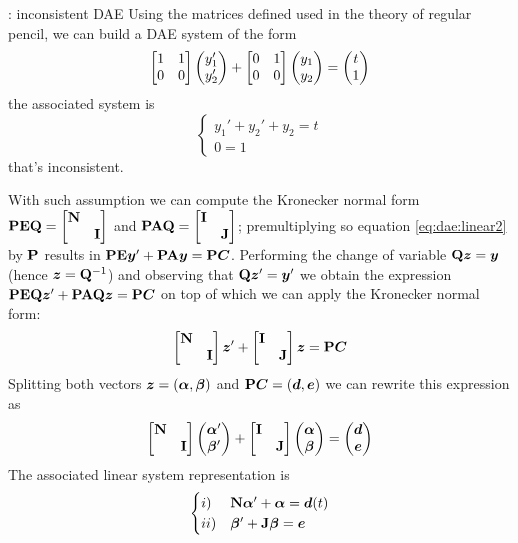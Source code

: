 		\begin{example}{: inconsistent DAE}
			Using the matrices defined used in the theory of regular pencil, we can build a DAE system of the form
			\[ \begin{bmatrix} 1 & 1 \\ 0 & 0 \end{bmatrix} \begin{pmatrix} y_1' \\ y_2' \end{pmatrix} + \begin{bmatrix} 0 & 1 \\ 0 & 0  \end{bmatrix} \begin{pmatrix} y_1 \\ y_2 \end{pmatrix} = \begin{pmatrix} t \\ 1 \end{pmatrix} \]
			the associated system is
			\[ \begin{cases}
				y_1' + y_2' + y_2 = t \\ 0 = 1
			\end{cases} \]
			that's inconsistent.
		\end{example}
		 With such assumption we can compute the Kronecker normal form $\mathbf{PEQ} = \begin{bmatrix} \mathbf{N} \\ & \mathbf{I} \end{bmatrix}$ and $\mathbf{PAQ} = \begin{bmatrix} \mathbf{I} \\ & \mathbf{J} \end{bmatrix}$; premultiplying so equation \ref{eq:dae:linear2} by $\mathbf{P}$ results in $\mathbf{PE}\boldsymbol{y}' + \mathbf{PA}\boldsymbol{y} = \mathbf{P} \boldsymbol{C}$.
	\newcommand{\y}{\vett y} \newcommand{\z}{\vett z} \newcommand{\inv}{^{-1}}
		Performing the change of variable $\mat Q \z = \y$ (hence $\z = \mat Q\inv$) and observing that $\mat Q \z' = \y'$ we obtain the expression $\mat{PEQ} \z' + \mat{PAQ}\z = \mat P\vett C$ on top of which we can apply the Kronecker normal form:
		\begin{equation} \label{eq:dae:kroneckernormalform}
			\matrix{\mat N \\ & \mat I} \z' + \matrix{\mat I \\ & \mat J} \z = \mat P \vett C
		\end{equation}
		Splitting both vectors $\boldsymbol{z} = (\boldsymbol{\alpha},\boldsymbol{\beta})$ and $\mathbf{P}\boldsymbol{C} = (\boldsymbol{d},\boldsymbol{e})$ we can rewrite this expression as
		\[ \begin{bmatrix} \mathbf{N} \\ & \mathbf{I} \end{bmatrix} \begin{pmatrix} \boldsymbol{\alpha}' \\ \boldsymbol{\beta}' \end{pmatrix} + \begin{bmatrix} \mathbf{I} \\ & \mathbf{J} \end{bmatrix} \begin{pmatrix} \boldsymbol{\alpha} \\ \boldsymbol{\beta} \end{pmatrix} =\begin{pmatrix} \boldsymbol{d} \\ \boldsymbol{e} \end{pmatrix}  \]
		The associated linear system representation is
		\[ \begin{cases}
			i)&\mathbf{N} \boldsymbol{\alpha} ' + \boldsymbol{\alpha} = \boldsymbol{d}(t) \\
			ii)& \boldsymbol{\beta}' + \mathbf{J} \boldsymbol{\beta} = \boldsymbol{e}
		\end{cases} \]
